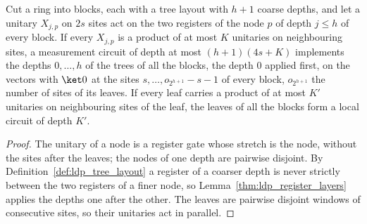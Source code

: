\begin{lemma}
    \label{thm:ldp_unequal_tree_rounds}
    \leanok
    Cut a ring into blocks, each with a tree layout with $h+1$ coarse depths, and
    let a unitary $X_{j,p}$ on $2s$ sites act on the two registers of the node
    $p$ of depth $j\le h$ of every block. If every $X_{j,p}$ is a product of at
    most $K$ unitaries on neighbouring sites, a measurement circuit of depth at most
    $(h+1)(4s+K)$ implements the depths $0,\dots,h$ of the trees of all the
    blocks, the depth $0$ applied first, on the vectors with $\ket0$ at the
    sites $s,\dots,o_{2^{h+1}}-s-1$ of every block, $o_{2^{h+1}}$ the number of
    sites of its leaves. If every leaf carries a product of at most $K'$
    unitaries on neighbouring sites of the leaf, the leaves of all the blocks
    form a local circuit of depth $K'$.
\end{lemma}
\begin{proof}
    \leanok
    The unitary of a node is a register gate whose stretch is the node, without
    the sites after the leaves; the nodes of one depth are pairwise disjoint.
    By Definition~\ref{def:ldp_tree_layout} a register of a coarser depth is
    never strictly between the two registers of a finer node, so
    Lemma~\ref{thm:ldp_register_layers} applies the depths one after the
    other. The leaves are pairwise disjoint windows of consecutive sites, so
    their unitaries act in parallel.
\end{proof}

